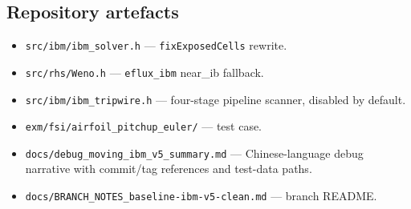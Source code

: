 \subsection{Repository artefacts}

\begin{itemize}
  \item \texttt{src/ibm/ibm\_solver.h} --- \texttt{fixExposedCells} rewrite.
  \item \texttt{src/rhs/Weno.h} --- \texttt{eflux\_ibm} near\_ib fallback.
  \item \texttt{src/ibm/ibm\_tripwire.h} --- four-stage pipeline scanner,
        disabled by default.
  \item \texttt{exm/fsi/airfoil\_pitchup\_euler/} --- test case.
  \item \texttt{docs/debug\_moving\_ibm\_v5\_summary.md} --- Chinese-language
        debug narrative with commit/tag references and test-data paths.
  \item \texttt{docs/BRANCH\_NOTES\_baseline-ibm-v5-clean.md} --- branch
        README.
\end{itemize}
